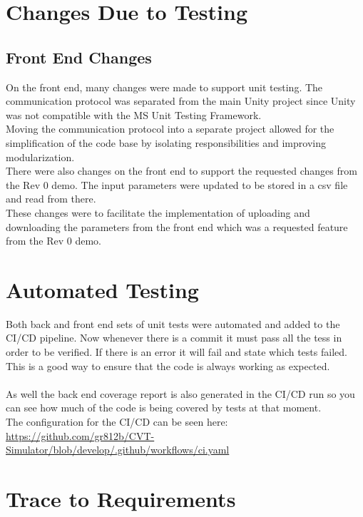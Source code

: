 \documentclass[12pt, titlepage]{article}
\begin{document}
\section{Changes Due to Testing}


\subsection{Front End Changes}
On the front end, many changes were made to support unit testing. The communication protocol was separated from the main Unity project since Unity was not compatible with the MS Unit Testing Framework.
\\
Moving the communication protocol into a separate project allowed for the simplification of the code base by isolating responsibilities and improving modularization.
\\
There were also changes on the front end to support the requested changes from the Rev 0 demo. The input parameters were updated to be stored in a csv file and read from there.
\\
These changes were to facilitate the implementation of uploading and downloading the parameters from the front end which was a requested feature from the Rev 0 demo.

\section{Automated Testing}
Both back and front end sets of unit tests were automated and added to the CI/CD pipeline. Now whenever there is a commit it must pass all the tess in order to be verified.
If there is an error it will fail and state which tests failed. This is a good way to ensure that the code is always working as expected.\\
\\
As well the back end coverage report is also generated in the CI/CD run so you can see how much of the code is being covered by tests at that moment.
\\
The configuration for the CI/CD can be seen here: \url{https://github.com/gr812b/CVT-Simulator/blob/develop/.github/workflows/ci.yaml}
\section{Trace to Requirements}
\end{document}
